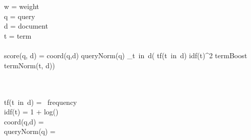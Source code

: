  \\ \\
w = weight\\
q = query \\
d = document \\
t = term \\ \\

score(q, d) = coord(q,d) \cdot queryNorm(q) \cdot \sum_{t\ in\ d}\left ( tf(t\ in\ d) \cdot idf(t)^2 \cdot termBoost \cdot termNorm(t, d)\right)

\\
 \\

tf(t\ in\ d) = \ frequency \\
idf(t) = 1 + log\left(\right) \\
coord(q,d) =  \\
queryNorm(q) = 

